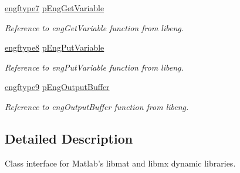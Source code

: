 \begin{DoxyCompactItemize}
\hyperlink{_matlab_library_8h_a1764197cbd1c4dbb4a7dc14405d0eaa8}{engftype7} \hyperlink{class_c_m_a_t_l_a_b_a73c962dcd9c9ad01cf0db9fff3346adb}{p\-Eng\-Get\-Variable}
\begin{DoxyCompactList}\small\item\em Reference to eng\-Get\-Variable function from libeng. \end{DoxyCompactList}\item 
\hyperlink{_matlab_library_8h_acc6e68fe4c87fc8b28417a49f7bbf040}{engftype8} \hyperlink{class_c_m_a_t_l_a_b_a2f377cb3dad070f45b0fe6f971f0a8c5}{p\-Eng\-Put\-Variable}
\begin{DoxyCompactList}\small\item\em Reference to eng\-Put\-Variable function from libeng. \end{DoxyCompactList}\item 
\hyperlink{_matlab_library_8h_a49ce13d36241af0257a6b66c29a65131}{engftype9} \hyperlink{class_c_m_a_t_l_a_b_a41eefdf98cf7dca3f766c3378b022746}{p\-Eng\-Output\-Buffer}
\begin{DoxyCompactList}\small\item\em Reference to eng\-Output\-Buffer function from libeng. \end{DoxyCompactList}\end{DoxyCompactItemize}


\subsection{Detailed Description}
Class interface for Matlab's libmat and libmx dynamic libraries. 

